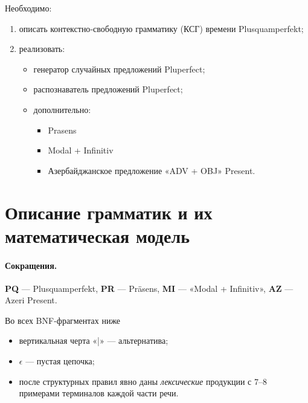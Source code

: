 \documentclass[areasetadvanced]{scrartcl}
\begin{document}
  Необходимо:
  \begin{enumerate}
    \item описать контекстно‑свободную грамматику (КСГ) времени Plusquamperfekt;
    \item реализовать:
      \begin{itemize}
        \item генератор случайных предложений Pluperfect;
        \item распознаватель предложений Pluperfect;
        \item дополнительно: \begin{itemize} 
          \item Prasens 
          \item Modal + Infinitiv 
          \item Азербайджанское предложение «ADV + OBJ» Present.
        \end{itemize}
      \end{itemize}
  \end{enumerate}
  \newpage

\section{Описание грамматик и их математическая модель}
\label{sec:descr}
\vspace{-0.5\baselineskip}

\paragraph*{Сокращения.}
\textbf{PQ} — Plusquamperfekt,\;
\textbf{PR} — Präsens,\;
\textbf{MI} — «Modal + Infinitiv»,\;
\textbf{AZ} — Azeri Present.

Во всех BNF-фрагментах ниже
\begin{itemize}
  \item вертикальная черта «|» — альтернатива;
  \item $\epsilon$ — пустая цепочка;
  \item после структурных правил явно даны
        \emph{лексические} продукции с 7–8 примерами терминалов каждой
        части речи.
\end{itemize}

\end{document}
